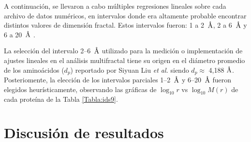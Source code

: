 	A continuaci\'{o}n, se llevaron a cabo m\'{u}ltiples regresiones lineales sobre cada archivo de datos num\'{e}ricos, en intervalos donde era altamente probable encontrar distintos valores de dimensi\'{o}n fractal. Estos intervalos fueron: 1 a 2~$\textup{\r{A}}$, 2 a 6~$\textup{\r{A}}$ y 6 a 20~$\textup{\r{A}}$ \cite{Enright2005, Liu2020}.	
	
	
	
	La selecci\'on del intervalo 2--6~$\textup{\r{A}}$ utilizado para la medici\'on o implementaci\'on de ajustes lineales en el an\'alisis multifractal tiene su origen en el di\'ametro promedio de los amino\'acidos ($d_p$) reportado por Siyuan Liu \textit{et al.} \cite{Liu2020} siendo $d_p \approx$ 4,188 $\textup{\r{A}}$. Posteriomente, la elecci\'{o}n de los intervalos parciales 1--2~$\textup{\r{A}}$ y 6--20~$\textup{\r{A}}$ fueron elegidos heur\'{i}sticamente, observando las gr\'{a}ficas de $\log_{10}r$ vs $\log_{10}M(r)$ de cada prote\'{i}na de la Tabla \ref{Tabla:ids9}.
	
	\section{Discusi\'{o}n de resultados}	
	
